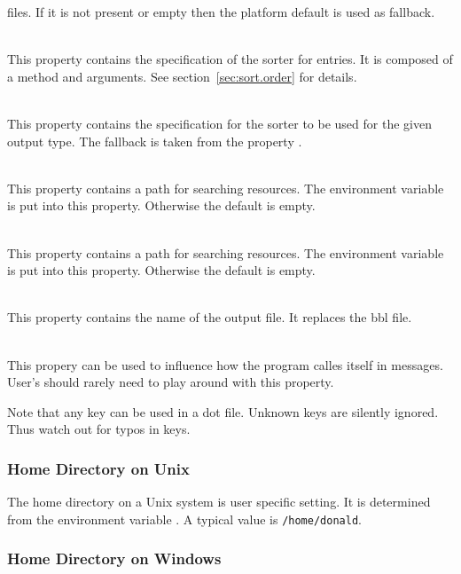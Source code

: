 \begin{description}
  files. If it is not present or empty then the platform default is
  used as fallback.
\item[\Property{exbib.sort}] \ \\
  This property contains the specification of the sorter for entries.
  It is composed of a method and arguments. See
  section~\ref{sec:sort.order} for details.
\item[\Property{exbib.sort.\Arg{type}}] \ \\
  This property contains the specification for the sorter to be used
  for the given output type. The fallback is taken from the property
  .
\item[\Property{texinputs}] \ \\
  This property contains a path for searching resources. The
  environment variable  is put into this property.
  Otherwise the default is empty.
\item[\Property{extex.texinputs}]  \ \\
  This property contains a path for searching resources. The
  environment variable  is put into this property.
  Otherwise the default is empty.
\item[\Property{exbib.output}] \ \\
  This property contains the name of the output file. It replaces the
  bbl file.
\item[\Property{program.name}] \ \\
  This propery can be used to influence how the program calles itself
  in messages. User's should rarely need to play around with this
  property.
\end{description}

Note that any key can be used in a dot file. Unknown
keys are silently ignored. Thus watch out for typos in keys.


\subsubsection{Home Directory on Unix}%

The home directory on a Unix system is user specific
setting. It is determined from the environment variable . A
typical value is \texttt{/home/donald}.

\subsubsection{Home Directory on Windows}%

